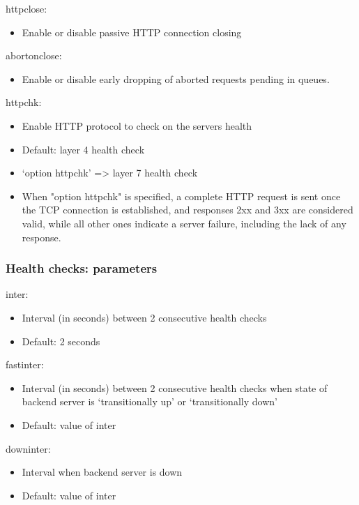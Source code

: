 \documentclass{article}
\begin{document}
httpclose:

\begin{itemize}
    \item Enable or disable passive HTTP connection closing
\end{itemize}

abortonclose:

\begin{itemize}
    \item Enable or disable early dropping of aborted requests pending in queues.
\end{itemize}

httpchk:

\begin{itemize}
    \item Enable HTTP protocol to check on the servers health
    \item Default: layer 4 health check
    \item `option httpchk' => layer 7 health check
    \item When "option httpchk" is specified, a complete HTTP request is sent once the TCP connection is established, 
        and responses 2xx and 3xx are considered valid, while all other ones indicate a server failure, 
        including the lack of any response.
\end{itemize}

\subsubsection{Health checks: parameters}

inter:

\begin{itemize}
    \item Interval (in seconds) between 2 consecutive health checks
    \item Default: 2 seconds
\end{itemize}

fastinter:

\begin{itemize}
    \item Interval (in seconds) between 2 consecutive health checks when state of backend server is `transitionally up' or `transitionally down'
    \item Default: value of inter
\end{itemize}

downinter:

\begin{itemize}
    \item Interval when backend server is down
    \item Default: value of inter
\end{itemize}
\end{document}
